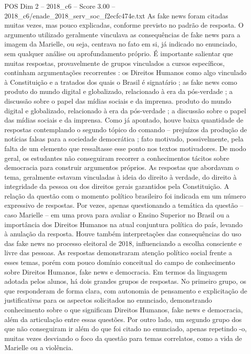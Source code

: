 \begin{textsample}{POS Dim 2 – 2018\_c6 – Score 3.00 – 2018\_c6/enade\_2018\_serv\_soc\_f2ecfc474e.txt}
As fake news foram citadas muitas vezes, mas pouco explicadas, conforme previsto no padrão de resposta.
O argumento utilizado geralmente vinculava as consequências de fake news para a imagem da Marielle, ou seja, centrava no fato em si, já indicado no enunciado, sem qualquer análise ou aprofundamento próprio.
É importante salientar que muitas respostas, provavelmente de grupos vinculados a cursos específicos, continham argumentações recorrentes : os Direitos Humanos como algo vinculado à Constituição e a tratados dos quais o Brasil é signatário ; as fake news como produto do mundo digital e globalizado, relacionado à era da pós-verdade ; a discussão sobre o papel das mídias sociais e da imprensa. produto do mundo digital e globalizado, relacionado à era da pós-verdade ; a discussão sobre o papel das mídias sociais e da imprensa.
Como já apontado, houve baixa quantidade de respostas contemplando o segundo tópico do comando – prejuízos da produção de notícias falsas para a sociedade democrática ; fato motivado, possivelmente, pela falta de um elemento que ressaltasse esse ponto nos textos motivadores.
De modo geral, os estudantes não conseguiram recorrer a conhecimentos tácitos sobre democracia para construir argumentos próprios.
As respostas que abordavam o tema, geralmente estavam vinculadas à ideia do direito à verdade, do direito à integridade da pessoa ou dos direitos gerais garantidos pela Constituição.
A relação da questão com o momento político brasileiro foi indicada em um número expressivo de respostas.
Por vezes, apenas questionando a temática da questão – caso Marielle – em uma prova para avaliar o Ensino Superior no Brasil ou a importância dos Direitos Humanos na atual conjuntura política do país, levando à anulação da resposta.
Houve também interpretações das consequências do uso das fake news no processo eleitoral de 2018, influenciando a escolha consciente e livre das pessoas.
As respostas demonstraram atenção político social frente a esses temas, porém com pouco domínio conceitual do campo de conhecimento sobre Direitos Humanos, fake news e democracia.
Em termos da linguagem adotada pelos alunos, há dois grandes grupos de respostas.
No primeiro grupo, os que responderam de forma clara, com autonomia de pensamento e explicitação de justificativas para os aspectos solicitados no enunciado, demonstrando conhecimento sobre o que significam Direitos Humanos, fake news e democracia, além da articulação entre essas questões.
Por outro lado, um segundo grupo dos que não conseguiram ir além do que foi citado no enunciado, apenas repetindo -o, muitas vezes desviando o foco da questão para temas correlatos, como a vida de Marielle ou a violência.

\end{textsample}
